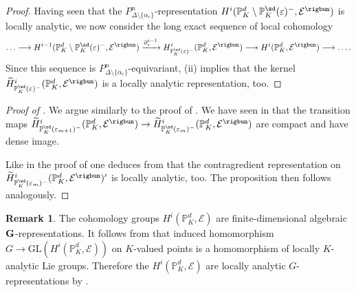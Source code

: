\documentclass[a4paper, reqno, 10pt]{amsart}
\theoremstyle{definition}
\newtheorem{remark}[theorem]{Remark}
\numberwithin{equation}{section}
\newcommand{\GL}{{\mathrm{GL}}}
\newcommand{\lra}{\longrightarrow}
\newcommand{\ra}{\rightarrow}
\newcommand{\BP}{{\mathbb {P}}}
\newcommand{\CE}{{\mathcal {E}}}
\newcommand{\bG}{{\mathrm{\bf G}}}
\begin{document}
\begin{proof}
	
	Having seen that the $P^n_{\Delta\setminus\{\alpha_r\}}$-representation $H^i(\BP^d_K\setminus \BP^\sd_K(\varepsilon)^-,\CE^\rigbun)$ is locally analytic, we now consider the long exact sequence of local cohomology 
	\begin{equation*}
		\ldots \lra H^{i-1}(\BP^d_K\setminus \BP^\sd_K(\varepsilon)^-,\CE^\rigbun) \xrightarrow{\partial^{i-1}_\varepsilon} H^i_{\BP_K^\sd (\varepsilon)^-} (\BP_K^d, \CE^\rigbun) \lra H^i (\BP_K^d, \CE^\rigbun) \lra \ldots .
	\end{equation*}
	Since this sequence is $P^n_{\Delta\setminus\{\alpha_r\}}$-equivariant,  (ii) implies that the kernel $\widetilde{H}^i_{\BP_K^\sd (\varepsilon)^-} (\BP_K^d, \CE^\rigbun)$ is a locally analytic representation, too.
\end{proof}







\begin{proof}[{Proof of }]
	We argue similarly to the proof of .
	We have seen in  that the transition maps $\widetilde{H}^i_{\BP^\sd_K(\varepsilon_{m+1})^-}(\BP^d_K,\CE^\rigbun) \ra	\widetilde{H}^i_{\BP^\sd_K(\varepsilon_{m})^-} (\BP^d_K,\CE^\rigbun)$ are compact and have dense image.
	
	Like in the proof of  one deduces from  that the contragredient representation on $\widetilde{H}^i_{\BP^\sd_K(\varepsilon_{m})^-}(\BP^d_K,\CE^\rigbun)'$ is locally analytic, too.
	The proposition then follows analogously. 
\end{proof}


\begin{remark}
	The cohomology groups $H^i (\BP_K^d, \CE)$ are finite-dimensional algebraic $\bG$-re\-pre\-sen\-tations.
	It follows from  that induced homomorphism $G \ra \GL(H^i (\BP_K^d,\CE) ) $ on $K$-valued points is a homomorphism of locally $K$-analytic Lie groups.
	Therefore the $H^i (\BP_K^d, \CE)$ are locally analytic $G$-representations by .
\end{remark}
\end{document}
